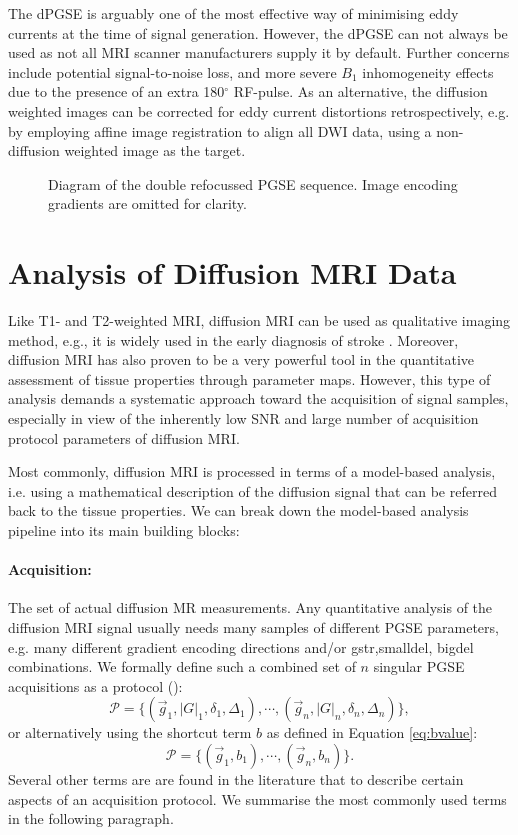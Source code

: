 The \gls{dPGSE} is arguably one of the most effective way of minimising eddy currents at the time of signal generation. However, the \gls{dPGSE} can not always be used as not all MRI scanner manufacturers supply it by default. Further concerns include potential signal-to-noise loss, and more severe $B_1$ inhomogeneity effects due to the presence of an extra 180$^\circ$ \gls{RF}-pulse. As an alternative, the diffusion weighted images can be corrected for eddy current distortions retrospectively, e.g. by employing affine image registration to align all \gls{DWI} data, using a non-diffusion weighted image as the target\citep{Rohde:2003}.


\begin{figure}[ht]
\centering
{}
\caption{Diagram of the double refocussed PGSE sequence. Image encoding gradients are omitted for clarity.}
\label{fig:chapter2 drpgse_diagram}
\end{figure}

\section{Analysis of Diffusion MRI Data}
Like T1- and T2-weighted MRI, diffusion MRI can be used as qualitative imaging method, e.g., it is widely used in the early diagnosis of stroke \citep{Moseley:1990, Warach:1992}. Moreover, diffusion MRI has also proven to be a very powerful tool in the quantitative assessment of tissue properties through parameter maps. However, this type of analysis demands a systematic approach toward the acquisition of signal samples, especially in view of the inherently low SNR and large number of acquisition protocol parameters of diffusion MRI.


Most commonly, diffusion MRI is processed in terms of a model-based analysis, i.e. using a mathematical description of the diffusion signal that can be referred back to the tissue properties. We can break down the model-based analysis pipeline into its main building blocks: 
\paragraph{Acquisition:} The set of actual diffusion MR measurements. Any quantitative analysis of the diffusion MRI signal usually needs many samples of different PGSE parameters, e.g. many different gradient encoding directions and/or \gls{gstr},\gls{smalldel}, \gls{bigdel} combinations. We formally define such a combined set of $n$ singular PGSE acquisitions as a protocol (\prot):
\begin{equation}
	\mathcal{P} = \{(\vec{g}_1,|G|_1,\delta_1,\Delta_1),\cdots,(\vec{g}_n,|G|_n,\delta_n,\Delta_n)\},
\end{equation}
or alternatively using the shortcut term $b$ as defined in Equation \ref{eq:bvalue}:
\begin{equation*}		
	\mathcal{P} = \{(\vec{g}_1,b_1),\cdots,(\vec{g}_n,b_n)\}.
\end{equation*}
Several other terms are are found in the literature that to describe certain aspects of an acquisition protocol. We summarise the most commonly used terms in the following paragraph. 


